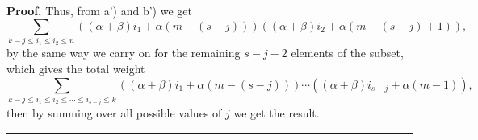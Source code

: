 \documentclass{article}
\newenvironment{proof}[1][Proof]{\noindent\textbf{#1.} }{\ \rule{0.5em}{0.5em}}
\begin{document}
\begin{proof}
Thus, from a') and b') we get
\begin{equation*}
\sum_{k-j\leq i_{1}\leq i_{2}\leq n}\left(
\left( \alpha +\beta \right) i_{1}+\alpha \left( m-\left( s-j\right) \right)
\right) \left( \left( \alpha +\beta \right) i_{2}+\alpha \left( m-\left(
s-j\right) +1\right) \right),
\end{equation*}
by the same way we carry on for the remaining $s-j-2$ elements of the subset, which gives the total weight
\begin{equation*}
\sum_{k-j\leq i_{1}\leq i_{2}\leq \cdots \leq i_{s-j}\leq
k}\left( \left( \alpha +\beta \right) i_{1}+\alpha \left( m-\left(
s-j\right) \right) \right) \cdots \left( \left( \alpha +\beta \right)
i_{s-j}+\alpha \left( m-1\right) \right),
\end{equation*}
then by summing over all possible values of $j$ we get the result.
\end{proof}



\end{document}
